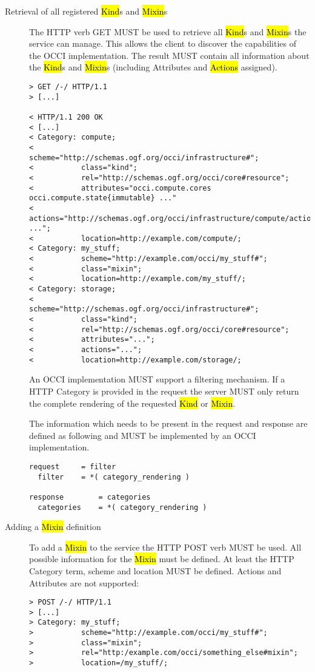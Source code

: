 \documentclass[10pt,a4paper]{article}
\begin{document}
\begin{description}
  \item[Retrieval of all registered \hl{Kind}s and \hl{Mixin}s] The
    HTTP verb GET MUST be used to retrieve all \hl{Kind}s and
    \hl{Mixin}s the service can manage. This allows the client to
    discover the capabilities of the OCCI implementation. The result
    MUST contain all information about the \hl{Kind}s and \hl{Mixin}s
    (including Attributes and \hl{Actions} assigned).

\begin{verbatim}
> GET /-/ HTTP/1.1
> [...]
 
< HTTP/1.1 200 OK
< [...]
< Category: compute;
<           scheme="http://schemas.ogf.org/occi/infrastructure#";
<           class="kind";
<           rel="http://schemas.ogf.org/occi/core#resource";
<           attributes="occi.compute.cores occi.compute.state{immutable} ..."
<           actions="http://schemas.ogf.org/occi/infrastructure/compute/action#stop ...";
<           location=http://example.com/compute/;
< Category: my_stuff;
<           scheme="http://example.com/occi/my_stuff#";
<           class="mixin";
<           location=http://example.com/my_stuff/;
< Category: storage;
<           scheme="http://schemas.ogf.org/occi/infrastructure#";
<           class="kind";
<           rel="http://schemas.ogf.org/occi/core#resource";
<           attributes="...";
<           actions="...";
<           location=http://example.com/storage/;
\end{verbatim}

    An OCCI implementation MUST support a filtering mechanism. If a
    HTTP Category is provided in the request the server MUST only
    return the complete rendering of the requested \hl{Kind} or
    \hl{Mixin}.

    The information which needs to be present in the request and
    response are defined as following and MUST be implemented by an
    OCCI implementation.

\begin{verbatim}
request     = filter
  filter    = *( category_rendering )

response        = categories
  categories    = *( category_rendering )
\end{verbatim}

  \item[Adding a \hl{Mixin} definition] To add a \hl{Mixin} to the
    service the HTTP POST verb MUST be used. All possible information
    for the \hl{Mixin} must be defined. At least the HTTP Category
    term, scheme and location MUST be defined. Actions and Attributes
    are not supported:
\begin{verbatim}
> POST /-/ HTTP/1.1
> [...]
> Category: my_stuff;
>           scheme="http://example.com/occi/my_stuff#";
>           class="mixin";
>           rel="http:/example.com/occi/something_else#mixin";
>           location=/my_stuff/;


\end{verbatim}
\end{description}
\end{document}
